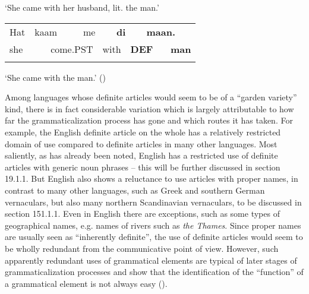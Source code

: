 \begin{styleTranslation}
‘She came with her husband, lit. the man.’

\end{styleTranslation}

\begin{tabular}{llllllllll}
\lsptoprule
Hat & \multicolumn{2}{l}{kaam

} & \multicolumn{2}{l}{me

} & \multicolumn{2}{l}{{\bfseries di}

} & \multicolumn{2}{l}{{\bfseries maan.}

} & \\
\multicolumn{2}{l}{she

} & \multicolumn{2}{l}{come.PST

} & \multicolumn{2}{l}{with

} & \multicolumn{2}{l}{{\bfseries DEF}

} & \multicolumn{2}{l}{{\bfseries man}

}\\
\lspbottomrule
\end{tabular}

\begin{styleTranslation}
 ‘She came with the man.’ (\citet[163]{Lyons1999})

\end{styleTranslation}

\begin{styleBodyTextFirst}
Among languages whose definite articles would seem to be of a “garden variety” kind, there is in fact considerable variation which is largely attributable to how far the grammaticalization process has gone and which routes it has taken. For example, the English definite article on the whole has a relatively restricted domain of use compared to definite articles in many other languages. Most saliently, as has already been noted, English has a restricted use of definite articles with generic noun phrases – this will be further discussed in section 19.1.1. But English also shows a reluctance to use articles with proper names, in contrast to many other languages, such as Greek and southern German vernaculars, but also many northern Scandinavian vernaculars, to be discussed in section 151.1.1. Even in English there are exceptions, such as some types of geographical names, e.g. names of rivers such as \textit{the Thames}. Since proper names are usually seen as “inherently definite”, the use of definite articles would seem to be wholly redundant from the communicative point of view. However, such apparently redundant uses of grammatical elements are typical of later stages of grammaticalization processes and show that the identification of the “function” of a grammatical element is not always easy (\citet[81-86]{Dahl2004}).

\end{styleBodyTextFirst}

